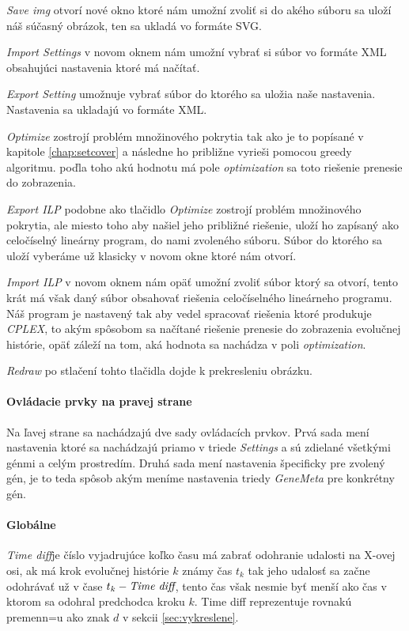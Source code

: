 \emph{Save img} otvorí nové okno ktoré nám umožní zvoliť si do akého súboru sa uloží náš súčasný obrázok, ten sa ukladá vo formáte SVG.

\emph{Import Settings} v novom oknem nám umožní vybrať si súbor vo formáte XML obsahujúci nastavenia ktoré má načítať.

\emph{Export Setting} umožnuje vybrať súbor do ktorého sa uložia naše nastavenia. Nastavenia sa ukladajú vo formáte XML.

\emph{Optimize} zostrojí problém množinového pokrytia tak ako je to popísané v kapitole \ref{chap:setcover} a následne ho približne vyrieši pomocou greedy algoritmu.
poďla toho akú hodnotu má pole \emph{optimization} sa toto riešenie prenesie do zobrazenia.

\emph{Export ILP} podobne ako tlačidlo \emph{Optimize} zostrojí problém množinového pokrytia, ale miesto toho aby našiel jeho približné riešenie,
uloží ho zapísaný ako celočíselný lineárny program, do nami zvoleného súboru. Súbor do ktorého sa uloží vyberáme už klasicky v novom okne ktoré nám otvorí.

\emph{Import ILP} v novom oknem nám opäť umožní zvoliť súbor ktorý sa otvorí, tento krát má však daný súbor obsahovať riešenia celočíselného lineárneho programu.
 Náš program je nastavený tak aby vedel spracovať riešenia ktoré produkuje \emph{CPLEX}, to akým spôsobom sa načítané riešenie prenesie do zobrazenia evolučnej histórie, opäť záleží na tom,
 aká hodnota sa nachádza v poli \emph{optimization}.
 
\emph{Redraw} po stlačení tohto tlačidla dojde k prekresleniu obrázku.
\paragraph{Ovládacie prvky na pravej strane}
Na ľavej strane sa nachádzajú dve sady ovládacích prvkov. Prvá sada mení nastavenia ktoré sa nachádzajú priamo v triede \emph{Settings} a sú zdielané všetkými génmi a celým prostredím.
Druhá sada mení nastavenia špecificky pre zvolený gén, je to teda spôsob akým meníme nastavenia triedy \emph{GeneMeta} pre konkrétny gén.
\paragraph{Globálne}\mbox{}\linebreak
\emph{Time diff}je číslo vyjadrujúce koľko času má zabrať odohranie udalosti na X-ovej osi, ak má krok evolučnej histórie $k$ známy čas $t_k$ tak 
jeho udalosť sa začne odohrávať už v čase $t_k - \emph{Time diff}$, tento čas však nesmie byť menší ako čas v ktorom sa odohral predchodca kroku $k$. Time diff reprezentuje rovnakú premenn=u ako znak $d$ v sekcii \ref{sec:vykreslene}. 

